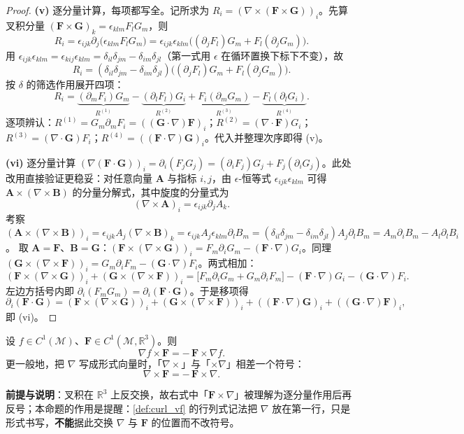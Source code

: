 \begin{proof}
\textbf{(v)} 逐分量计算，每项都写全。记所求为 $R_i = (\nabla\times(\mathbf F\times\mathbf G))_i$。先算叉积分量 $(\mathbf F\times\mathbf G)_k = \epsilon_{klm}F_lG_m$，则
\[
R_i = \epsilon_{ijk}\partial_j\bigl(\epsilon_{klm}F_lG_m\bigr)
= \epsilon_{ijk}\epsilon_{klm}\bigl((\partial_jF_l)G_m + F_l(\partial_jG_m)\bigr).
\]
用 $\epsilon_{ijk}\epsilon_{klm} = \epsilon_{kij}\epsilon_{klm} = \delta_{il}\delta_{jm}-\delta_{im}\delta_{jl}$（第一式用 $\epsilon$ 在循环置换下标下不变），故
\[
R_i = (\delta_{il}\delta_{jm}-\delta_{im}\delta_{jl})\bigl((\partial_jF_l)G_m + F_l(\partial_jG_m)\bigr).
\]
按 $\delta$ 的筛选作用展开四项：
\[
R_i = \underbrace{(\partial_mF_i)G_m}_{R^{(1)}} - \underbrace{(\partial_lF_l)G_i}_{R^{(2)}} + \underbrace{F_i(\partial_mG_m)}_{R^{(3)}} - \underbrace{F_l(\partial_lG_i)}_{R^{(4)}} .
\]
逐项辨认：$R^{(1)}=G_m\partial_mF_i = ((\mathbf G\cdot\nabla)\mathbf F)_i$；$R^{(2)}=(\nabla\cdot\mathbf F)G_i$；$R^{(3)}=(\nabla\cdot\mathbf G)F_i$；$R^{(4)}=((\mathbf F\cdot\nabla)\mathbf G)_i$。代入并整理次序即得 (v)。

\textbf{(vi)} 逐分量计算 $(\nabla(\mathbf F\cdot\mathbf G))_i = \partial_i(F_jG_j) = (\partial_iF_j)G_j + F_j(\partial_iG_j)$。此处改用直接验证更稳妥：对任意向量 $\mathbf A$ 与指标 $i,j$，由 $\epsilon$-恒等式 $\epsilon_{ijk}\epsilon_{klm}$ 可得 $\mathbf A\times(\nabla\times\mathbf B)$ 的分量分解式，其中旋度的分量式为
\[
(\nabla\times\mathbf A)_i = \epsilon_{ijk}\partial_jA_k .
\]
考察 $(\mathbf A\times(\nabla\times\mathbf B))_i = \epsilon_{ijk}A_j(\nabla\times\mathbf B)_k = \epsilon_{ijk}A_j\epsilon_{klm}\partial_lB_m = (\delta_{il}\delta_{jm}-\delta_{im}\delta_{jl})A_j\partial_lB_m = A_m\partial_iB_m - A_l\partial_lB_i$。
取 $\mathbf A=\mathbf F$、$\mathbf B=\mathbf G$：$(\mathbf F\times(\nabla\times\mathbf G))_i = F_m\partial_iG_m - (\mathbf F\cdot\nabla)G_i$。同理 $(\mathbf G\times(\nabla\times\mathbf F))_i = G_m\partial_iF_m - (\mathbf G\cdot\nabla)F_i$。两式相加：
\[
(\mathbf F\times(\nabla\times\mathbf G))_i + (\mathbf G\times(\nabla\times\mathbf F))_i
= \bigl[F_m\partial_iG_m + G_m\partial_iF_m\bigr] - (\mathbf F\cdot\nabla)G_i - (\mathbf G\cdot\nabla)F_i .
\]
左边方括号内即 $\partial_i(F_mG_m) = \partial_i(\mathbf F\cdot\mathbf G)$。于是移项得
\[
\partial_i(\mathbf F\cdot\mathbf G) = (\mathbf F\times(\nabla\times\mathbf G))_i + (\mathbf G\times(\nabla\times\mathbf F))_i + ((\mathbf F\cdot\nabla)\mathbf G)_i + ((\mathbf G\cdot\nabla)\mathbf F)_i,
\]
即 (vi)。
\end{proof}

\begin{proposition}[形式算子的反交换性]\label{prop:product_rules_orientation}
设 $f\in C^1(\mathcal M)$、$\mathbf F\in C^1(\mathcal M,\mathbb R^3)$。则
\[
\nabla f\times\mathbf F = -\,\mathbf F\times\nabla f .
\]
更一般地，把 $\nabla$ 写成形式向量时，「$\nabla\times$」与「$\times\nabla$」相差一个符号：
\[
\nabla\times\mathbf F = -\,\mathbf F\times\nabla .
\]

\textbf{前提与说明}：叉积在 $\mathbb R^3$ 上反交换，故右式中「$\mathbf F\times\nabla$」被理解为逐分量作用后再反号；本命题的作用是提醒：\cref{def:curl_vf} 的行列式记法把 $\nabla$ 放在第一行，只是形式书写，\textbf{不能}据此交换 $\nabla$ 与 $\mathbf F$ 的位置而不改符号。
\end{proposition}

